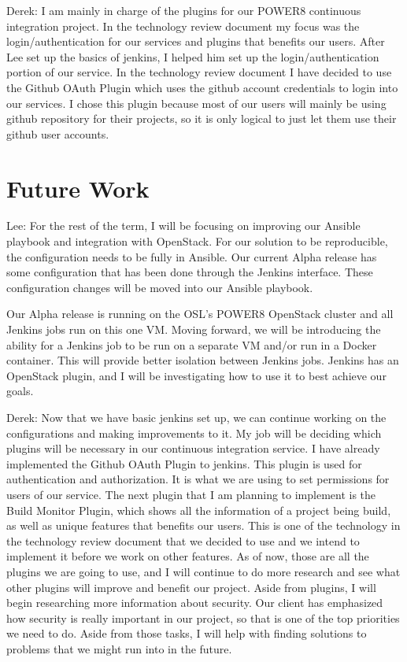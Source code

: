 \documentclass[10pt,onecolumn,journal,draftclsnofoot]{IEEEtran}
\begin{document}
Derek:
I am mainly in charge of the plugins for our POWER8 continuous integration project. In the technology review document my focus was the login/authentication for our services and plugins that benefits our users. After Lee set up the basics of jenkins, I helped him set up the login/authentication portion of our service. In the technology review document I have decided to use the Github OAuth Plugin which uses the github account credentials to login into our services. I chose this plugin because most of our users will mainly be using github repository for their projects, so it is only logical to just let them use their github user accounts.



\section{Future Work}

Lee:
For the rest of the term, I will be focusing on improving our Ansible playbook and integration with OpenStack.
For our solution to be reproducible, the configuration needs to be fully in Ansible.
Our current Alpha release has some configuration that has been done through the Jenkins interface.
These configuration changes will be moved into our Ansible playbook.

Our Alpha release is running on the OSL's POWER8 OpenStack cluster and all Jenkins jobs run on this one VM.
Moving forward, we will be introducing the ability for a Jenkins job to be run on a separate VM and/or run in a Docker container.
This will provide better isolation between Jenkins jobs.
Jenkins has an OpenStack plugin, and I will be investigating how to use it to best achieve our goals.

Derek:
Now that we have basic jenkins set up, we can continue working on the configurations and making improvements to it. My job will be deciding which plugins will be necessary in our continuous integration service. I have already implemented the Github OAuth Plugin to jenkins. This plugin is used for authentication and authorization. It is what we are using to set permissions for users of our service. The next plugin that I am planning to implement is the Build Monitor Plugin, which shows all the information of a project being build, as well as unique features that benefits our users. This is one of the technology in the technology review document that we decided to use and we intend to implement it before we work on other features. As of now, those are all the plugins we are going to use, and I will continue to do more research and see what other plugins will improve and benefit our project. Aside from plugins, I will begin researching more information about security. Our client has emphasized how security is really important in our project, so that is one of the top priorities we need to do. Aside from those tasks, I will help with finding solutions to problems that we might run into in the future.
\end{document}
